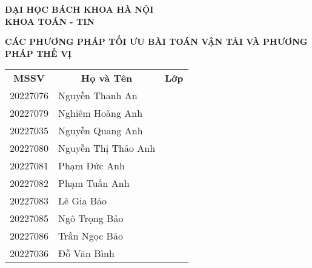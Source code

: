 
\begin{center}
    \Large
    \vspace{-1cm}
    {\bfseries ĐẠI HỌC BÁCH KHOA HÀ NỘI}\\
    {\bfseries KHOA TOÁN - TIN}
\end{center}


\vspace{4.5cm}

\begin{center}
	\fontsize{20pt}{16pt}\selectfont 	
	{\bfseries CÁC PHƯƠNG PHÁP TỐI ƯU BÀI TOÁN VẬN TẢI VÀ PHƯƠNG PHÁP THẾ VỊ}

    \vspace{1cm}
    
    \fontsize{22pt}{16pt}\selectfont
	{\bfseries }

    \vspace{1cm}
    \fontsize{16pt}{16pt}
    \begin{table}[h]
        \centering
        {\fontsize{16pt}{16pt}\selectfont %
        \begin{tabular}{clc}
        \textbf{MSSV} & \multicolumn{1}{c}{\textbf{Họ và Tên}} & \textbf{Lớp} \\
        20227076      & Nguyễn Thanh An                        &              \\
        20227079      & Nghiêm Hoàng Anh                       &              \\
        20227035      & Nguyễn Quang Anh                       &              \\
        20227080      & Nguyễn Thị Thảo Anh                    &              \\
        20227081      & Phạm Đức Anh                           &              \\
        20227082      & Phạm Tuấn Anh                          &              \\
        20227083      & Lê Gia Bảo                             &              \\
        20227085      & Ngô Trọng Bảo                          &              \\
        20227086      & Trần Ngọc Bảo                          &              \\
        20227036      & Đỗ Văn Bình                            &             
        \end{tabular}
        } %
    \end{table}
    \vspace{0.5cm}
	
%
\end{center}

